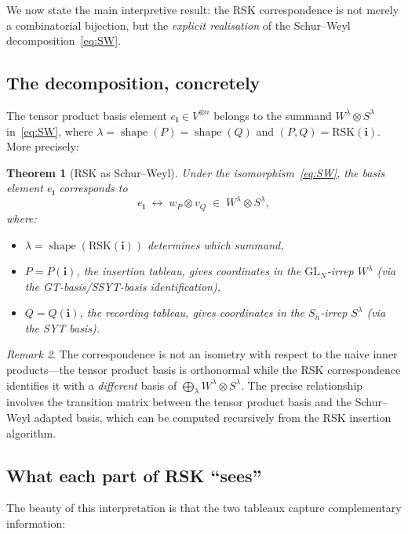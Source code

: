 \documentclass[12pt,a4paper]{article}
\newtheorem{theorem}{Theorem}[section]
\theoremstyle{definition}
\theoremstyle{remark}
\newtheorem{remark}[theorem]{Remark}
\newcommand{\shape}{\operatorname{shape}}
\begin{document}
We now state the main interpretive result: the RSK correspondence is
not merely a combinatorial bijection, but the \emph{explicit
realisation} of the Schur--Weyl decomposition~\eqref{eq:SW}.

\subsection{The decomposition, concretely}

The tensor product basis element $e_\mathbf{i} \in V^{\otimes n}$
belongs to the summand $W^\lambda \otimes S^\lambda$
in~\eqref{eq:SW}, where $\lambda = \shape(P) = \shape(Q)$ and
$(P, Q) = \mathrm{RSK}(\mathbf{i})$. More precisely:

\begin{theorem}[RSK as Schur--Weyl]\label{thm:RSK-SW}
Under the isomorphism~\eqref{eq:SW}, the basis element $e_\mathbf{i}$
corresponds to
\[
  e_\mathbf{i} \;\longleftrightarrow\;
  w_P \otimes v_Q
  \;\in\; W^\lambda \otimes S^\lambda,
\]
where:
\begin{itemize}
\item $\lambda = \shape(\mathrm{RSK}(\mathbf{i}))$ determines which
  summand,
\item $P = P(\mathbf{i})$, the insertion tableau, gives coordinates
  in the $\mathrm{GL}_N$-irrep $W^\lambda$ (via the
  GT-basis/SSYT-basis identification),
\item $Q = Q(\mathbf{i})$, the recording tableau, gives coordinates
  in the $S_n$-irrep $S^\lambda$ (via the SYT basis).
\end{itemize}
\end{theorem}

\begin{remark}\label{rem:not-isometry}
The correspondence is not an isometry with respect to the naive inner
products---the tensor product basis is orthonormal while the RSK
correspondence identifies it with a \emph{different} basis of
$\bigoplus_\lambda W^\lambda \otimes S^\lambda$. The precise
relationship involves the transition matrix between the tensor product
basis and the Schur--Weyl adapted basis, which can be computed
recursively from the RSK insertion algorithm.
\end{remark}

\subsection{What each part of RSK ``sees''}

The beauty of this interpretation is that the two tableaux capture
complementary information:
\end{document}
